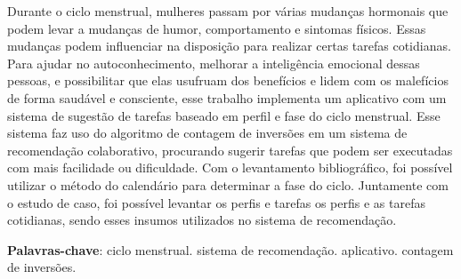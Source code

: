 \begin{resumo}

    Durante o ciclo menstrual, mulheres passam por várias mudanças hormonais que podem levar a 
    mudanças de humor, comportamento e sintomas físicos. Essas mudanças podem influenciar na 
    disposição para realizar certas tarefas cotidianas. Para 
    ajudar no autoconhecimento, melhorar a inteligência emocional 
    dessas pessoas, e possibilitar que elas usufruam dos benefícios e lidem com os 
    malefícios 
    de forma saudável e consciente, esse trabalho implementa um aplicativo com um sistema de 
    sugestão de tarefas baseado em 
    perfil e fase do ciclo menstrual. Esse sistema faz uso do algoritmo de contagem de inversões
    em um sistema de recomendação colaborativo, procurando sugerir tarefas 
    que podem ser executadas com mais facilidade ou dificuldade. Com o levantamento bibliográfico, 
    foi possível utilizar o método do calendário para determinar a fase do ciclo. Juntamente com o 
    estudo de caso, foi possível levantar os perfis e tarefas os perfis e as tarefas cotidianas, 
    sendo esses insumos utilizados no sistema de recomendação.
    
     \vspace{\onelineskip}
        
     \noindent
     \textbf{Palavras-chave}: ciclo menstrual. sistema de recomendação. aplicativo. contagem de inversões.
    \end{resumo}
    